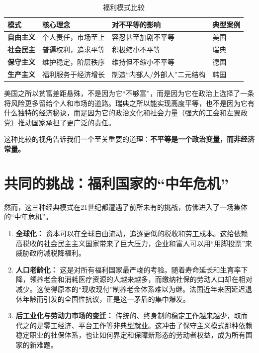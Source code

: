 \documentclass[a5paper, 11pt, openany]{ctexbook}
\begin{document}
\begin{table}[htbp]
  \centering
  \caption{福利模式比较}
  \begin{tabular}{@{}llll@{}}
    \toprule
    \textbf{模式} & \textbf{核心理念} & \textbf{对不平等的影响} & \textbf{典型案例} \\
    \midrule
    \textbf{自由主义} & 个人责任，市场至上 & 容忍甚至加剧不平等 & 美国 \\
    \textbf{社会民主} & 普遍权利，追求平等 & 积极缩小不平等 & 瑞典 \\
    \textbf{保守主义} & 维护稳定，阶层秩序 & 维持但不缩小不平等 & 德国 \\
    \textbf{生产主义} & 福利服务于经济增长 & 制造“内部人/外部人”二元结构 & 韩国\\
    \bottomrule
  \end{tabular}
\end{table}

美国之所以贫富差距悬殊，不是因为它“不够富”，而是因为它在政治上选择了一条将风险更多留给个人和市场的道路。瑞典之所以能实现高度平等，也不是因为它有什么独特的经济秘诀，而是因为它的政治文化和社会力量（强大的工会和左翼政党）推动国家承担了更广泛的责任。

这种比较的视角告诉我们一个至关重要的道理：\textbf{不平等是一个政治变量，而非经济常量。}

\section{共同的挑战：福利国家的“中年危机”}

然而，这三种经典模式在21世纪都遭遇了前所未有的挑战，仿佛进入了一场集体的“中年危机”。
\begin{enumerate}
    \item \textbf{全球化：} 资本可以在全球自由流动，追逐更低的税收和劳工成本。这给依赖高税收的社会民主主义国家带来了巨大压力，企业和富人可以用“用脚投票”来威胁政府减税降福利。
    \item \textbf{人口老龄化：} 这是对所有福利国家最严峻的考验。随着寿命延长和生育率下降，领养老金和消耗医疗资源的人越来越多，而缴纳社保的劳动人口却在相对减少。这使得原本的“现收现付”制养老金体系难以为继。法国近年来因延迟退休年龄而引发的全国性抗议，正是这一矛盾的集中爆发。
    \item \textbf{后工业化与劳动力市场的变迁：} 传统的、终身制的稳定工作越来越少，取而代之的是零工经济、平台工作等非典型就业。这冲击了保守主义模式那种依赖稳定职业的社保体系，也让如何界定和保障新形态的劳动者权益，成为所有国家的新难题。
\end{enumerate}
\end{document}
